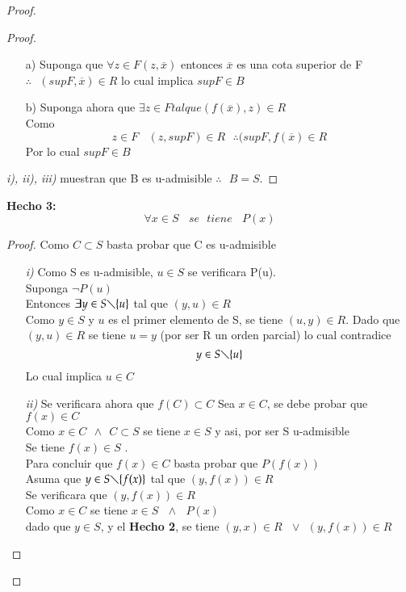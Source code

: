 \begin{proof}
\begin{proof}
\begin{itemize}
\begin{itemize}
\item[a)]
Suponga que $ \forall z \in F (z,\overline{x}) $ entonces $ \overline{x} $ es una cota superior de F\\
$ \therefore \ \ \ (supF, \overline{x}) \in R $ lo cual implica $ supF \in B $
\item[b)] Suponga ahora que $ \exists z \in F tal que (f(\overline{x}), z) \in R $ \\
Como $$ z \in F \ \ \ \ (z,supF) \in R \ \ \ \therefore (supF,f(\overline{x}) \in R $$
Por lo cual $ supF \in B $ 
\end{itemize}

\end{itemize}
\textit{i), ii), iii)} muestran que B es u-admisible  $ \therefore \ \ \ B=S $.
\end{proof}
\textbf{Hecho 3:}  $$\forall x \in S \ \ \ \  se \ \ \  tiene \ \ \ \  P(x) $$
\begin{proof}
Como $ C \subset S $ basta probar que C es u-admisible 
\begin{itemize}
\item[\textit{i)}] Como S es u-admisible, $ u \in S $ se verificara P(u).\\
Suponga $ \neg P(u) $\\
Entonces $ \exists y \in S \diagdown \lbrace u \rbrace $ tal que $ (y,u) \in R $\\
Como $ y\in S  $ y $ u $ es el primer elemento de S, se tiene $(u,y) \in R  $. Dado que $ (y,u) \in R $ 
se tiene $ u=y $ (por ser R un orden parcial) lo cual contradice 
$$ y \in S \diagdown \lbrace u \rbrace $$ 
Lo cual implica $ u \in C $
\item[\textit{ii)}] Se verificara ahora que $ f(C) \subset C $
Sea $ x \in C $, se debe probar que  $ f(x) \in C $\\
Como $ x \in C  \ \ \wedge \ \ C \subset S $ se tiene $ x \in S $ y asi, por ser S u-admisible \\
Se tiene $ f(x) \in S $ .\\
 Para concluir que $f(x) \in C  $ basta probar que $ P(f(x)) $\\
Asuma que $ y \in S \diagdown \lbrace f(x) \rbrace $ tal que $ (y,f(x)) \in R $\\
Se verificara que $ (y,f(x)) \in R $\\
Como $ x \in C $ se tiene $ x \in S \ \ \ \wedge \ \ \ P(x) $\\
dado que $ y \in S $, y el \textbf{Hecho 2}, se tiene $ (y,x) \in R \ \ \ \vee \ \ (y,f(x)) \in R $\\


\end{itemize}
\end{proof}
\end{proof}
